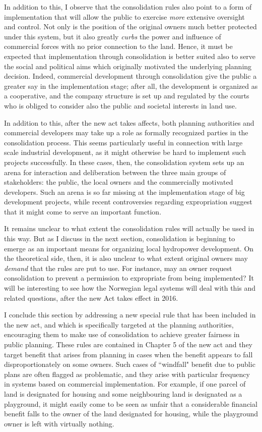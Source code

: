 In addition to this, I observe that the consolidation rules also point to a form of implementation that will allow the public to exercise \emph{more} extensive oversight and control. Not only is the position of the original owners much better protected under this system, but it also greatly \emph{curbs} the power and influence of commercial forces with no prior connection to the land. Hence, it must be expected that implementation through consolidation is better suited also to serve the social and political aims which originally motivated the underlying planning decision. Indeed, commercial development through consolidation give the public a greater say in the implementation stage; after all, the development is organized as a cooperative, and the company structure is set up and regulated by the courts who is obliged to consider also the public and societal interests in land use.

In addition to this, after the new act takes affects, both planning authorities and commercial developers may take up a role as formally recognized parties in the consolidation process. This seems particularly useful in connection with large scale industrial development, as it might otherwise be hard to implement such projects successfully. In these cases, then, the consolidation system sets up an arena for interaction and deliberation between the three main groups of stakeholders: the public, the local owners and the commercially motivated developers. Such an arena is so far missing at the implementation stage of big development projects, while recent controversies regarding expropriation suggest that it might come to serve an important function.

It remains unclear to what extent the consolidation rules will actually be used in this way. But as I discuss in the next section, consolidation is beginning to emerge as an important means for organizing local hydropower development. On the theoretical side, then, it is also unclear to what extent original owners may \emph{demand} that the rules are put to use. For instance, may an owner request consolidation to prevent a permission to expropriate from being implemented? It will be interesting to see how the Norwegian legal systems will deal with this and related questions, after the new Act takes effect in 2016.

I conclude this section by addressing a new special rule that has been included in the new act, and which is specifically targeted at the planning authorities, encouraging them to make use of consolidation to achieve  greater fairness in public planning. These rules are contained in Chapter 5 of the new act and they target benefit that arises from planning in cases when the benefit appears to fall disproportionately on some owners. Such cases of ``windfall" benefit due to public plans are often flagged as problematic, and they arise with particular frequency in systems based on commercial implementation. For example, if one parcel of land is designated for housing and some neighbouring land is designated as a playground, it might easily come to be seen as unfair that a considerable financial benefit falls to the owner of the land designated for housing, while the playground owner is left with virtually nothing.

